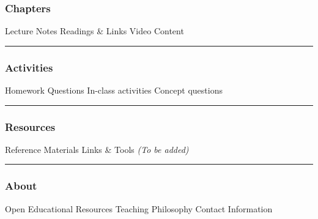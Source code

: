 \subsubsection{Chapters}\label{chapters}

Lecture Notes Readings \& Links Video Content

\begin{center}\rule{0.5\linewidth}{0.5pt}\end{center}

\subsubsection{Activities}\label{activities}

Homework Questions In-class activities Concept questions

\begin{center}\rule{0.5\linewidth}{0.5pt}\end{center}

\subsubsection{Resources}\label{resources}

Reference Materials Links \& Tools \emph{(To be added)}

\begin{center}\rule{0.5\linewidth}{0.5pt}\end{center}

\subsubsection{About}\label{about}

Open Educational Resources Teaching Philosophy Contact Information
